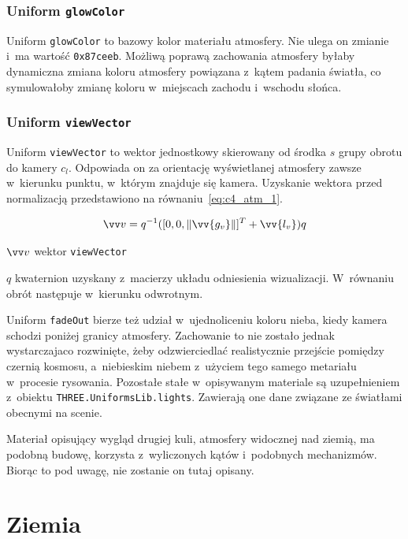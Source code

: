 \subsubsection{Uniform \texttt{glowColor}}
Uniform \texttt{glowColor} to bazowy kolor materiału atmosfery. Nie ulega on zmianie i~ma wartość \texttt{0x87ceeb}. Możliwą poprawą zachowania atmosfery byłaby dynamiczna zmiana koloru atmosfery powiązana z~kątem padania światła, co symulowałoby zmianę koloru w~miejscach zachodu i~wschodu słońca.

\subsubsection{Uniform \texttt{viewVector}}
Uniform \texttt{viewVector} to wektor jednostkowy skierowany od środka $s$ grupy obrotu do kamery $c_l$. Odpowiada on za orientację wyświetlanej atmosfery zawsze w~kierunku punktu, w~którym znajduje się kamera. Uzyskanie wektora przed normalizacją przedstawiono na równaniu~\ref{eq:c4_atm_1}.

\begin{equation}
  \label{eq:c4_atm_1}
  \vv v = q^{-1}([0, 0, \length{\vv{g_v}}]^T + \vv{l_v})q
\end{equation}
\begin{eqexpl}[25mm]
\item {$\vv v$} wektor \texttt{viewVector}
\item {$q$} kwaternion uzyskany z~macierzy układu odniesienia wizualizacji. W~równaniu obrót następuje w~kierunku odwrotnym.
\end{eqexpl}

Uniform \texttt{fadeOut} bierze też udział w~ujednoliceniu koloru nieba, kiedy kamera schodzi poniżej granicy atmosfery. Zachowanie to nie zostało jednak wystarczajaco rozwinięte, żeby odzwierciedlać realistycznie przejście pomiędzy czernią kosmosu, a~niebieskim niebem z~użyciem tego samego metariału w~procesie rysowania. Pozostałe stałe w~opisywanym materiale są uzupełnieniem z~obiektu \mbox{\texttt{THREE.UniformsLib.lights}}. Zawierają one dane związane ze światłami obecnymi na scenie. 

Materiał opisujący wygląd drugiej kuli, atmosfery widocznej nad ziemią, ma podobną budowę, korzysta z~wyliczonych kątów i~podobnych mechanizmów. Biorąc to pod uwagę, nie zostanie on tutaj opisany. 

\section{Ziemia}

